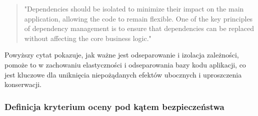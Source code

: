 \documentclass[runningheads,12pt]{llncs}
\begin{document}
\begin{enumerate}
    \begin{quote}
        "Dependencies should be isolated to minimize their impact on the main application, allowing the code to remain flexible. One of the key principles of dependency management is to ensure that dependencies can be replaced without affecting the core business logic." ~\cite[p. 218]{martin2008clean}
    \end{quote}
    Powyższy cytat pokazuje, jak ważne jest odseparowanie i izolacja zależności, pomoże to w zachowaniu elastyczności i odseparowania bazy kodu aplikacji, co jest kluczowe dla uniknięcia niepożądanych efektów ubocznych i uproszczenia konserwacji.
\end{enumerate}

\subsubsection{Definicja kryterium oceny pod kątem bezpieczeństwa}
\end{document}
